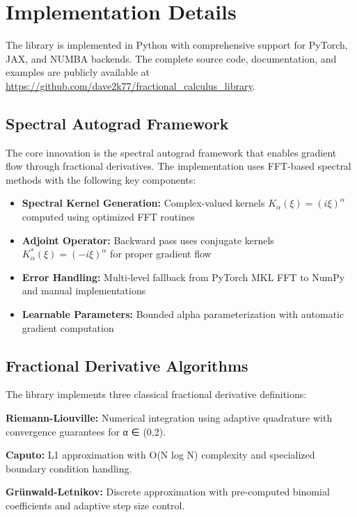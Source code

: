 \section{Implementation Details}

The \hpfracc library is implemented in Python with comprehensive support for PyTorch, JAX, and NUMBA backends. The complete source code, documentation, and examples are publicly available at \url{https://github.com/dave2k77/fractional_calculus_library}.

\subsection{Spectral Autograd Framework}

The core innovation is the spectral autograd framework that enables gradient flow through fractional derivatives. The implementation uses FFT-based spectral methods with the following key components:

\begin{itemize}
    \item \textbf{Spectral Kernel Generation:} Complex-valued kernels $K_\alpha(\xi) = (i\xi)^\alpha$ computed using optimized FFT routines
    \item \textbf{Adjoint Operator:} Backward pass uses conjugate kernels $K_\alpha^*(\xi) = (-i\xi)^\alpha$ for proper gradient flow
    \item \textbf{Error Handling:} Multi-level fallback from PyTorch MKL FFT to NumPy and manual implementations
    \item \textbf{Learnable Parameters:} Bounded alpha parameterization with automatic gradient computation
\end{itemize}

\subsection{Fractional Derivative Algorithms}

The library implements three classical fractional derivative definitions:

\textbf{Riemann-Liouville:} Numerical integration using adaptive quadrature with convergence guarantees for α ∈ (0,2).

\textbf{Caputo:} L1 approximation with O(N log N) complexity and specialized boundary condition handling.

\textbf{Grünwald-Letnikov:} Discrete approximation with pre-computed binomial coefficients and adaptive step size control.

